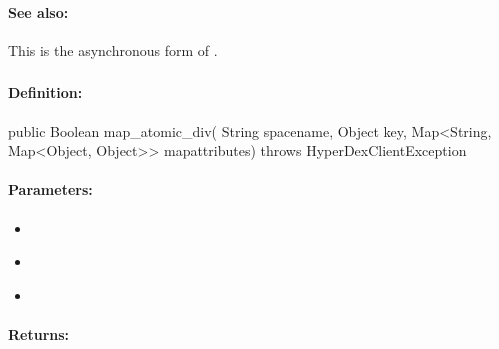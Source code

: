 \paragraph{See also:}  This is the asynchronous form of .

\pagebreak
\subsubsection{}
\label{api:java:map_atomic_div}


\paragraph{Definition:}
\begin{javacode}
public Boolean map_atomic_div(
        String spacename,
        Object key,
        Map<String, Map<Object, Object>> mapattributes) throws HyperDexClientException
\end{javacode}

\paragraph{Parameters:}
\begin{itemize}[noitemsep]
\item {}\\

\item {}\\

\item {}\\

\end{itemize}

\paragraph{Returns:}


\pagebreak
\subsubsection{}
\label{api:java:async_map_atomic_div}


